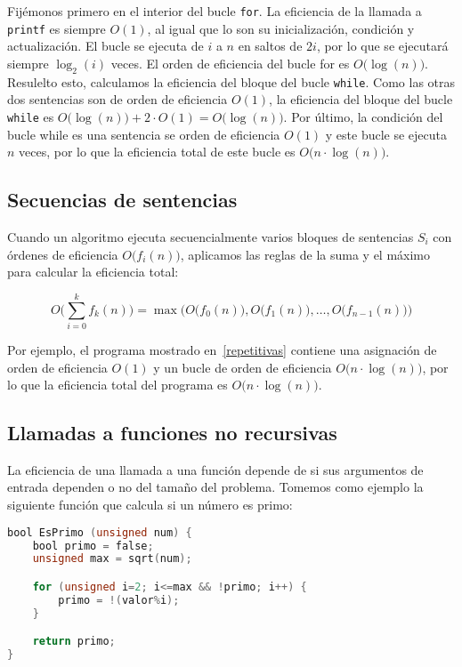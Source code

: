 Fijémonos primero en el interior del bucle \texttt{for}.
La eficiencia de la llamada a \texttt{printf} es siempre $O(1)$, al igual que lo son su inicialización, condición y actualización.
El bucle se ejecuta de $i$ a $n$ en saltos de $2i$, por lo que se ejecutará siempre $\log_2(i)$ veces.
El orden de eficiencia del bucle for es $O\big(\log(n)\big)$.
Resulelto esto, calculamos la eficiencia del bloque del bucle \texttt{while}.
Como las otras dos sentencias son de orden de eficiencia $O(1)$, la eficiencia del bloque del bucle \texttt{while} es $O\big(\log(n)\big)+2\cdot O(1)=O\big(\log(n)\big)$.
Por último, la condición del bucle while es una sentencia se orden de eficiencia $O(1)$ y este bucle se ejecuta $n$ veces, por lo que la eficiencia total de este bucle es $O\big(n\cdot\log(n)\big)$.

\pagebreak

\subsection{Secuencias de sentencias}\label{secuenciasentencias}

Cuando un algoritmo ejecuta secuencialmente varios bloques de sentencias $S_i$ con órdenes de eficiencia $O\big(f_i(n)\big)$, aplicamos las reglas de la suma y el máximo para calcular la eficiencia total:

\[O\Big(\sum_{i=0}^{k}f_k(n)\Big) = \max\Big(O\big(f_0(n)\big),O\big(f_1(n)\big),\ldots,O\big(f_{n-1}(n)\big)\Big)\]

Por ejemplo, el programa mostrado en~\ref{repetitivas} contiene una asignación de orden de eficiencia $O(1)$ y un bucle de orden de eficiencia $O\big(n\cdot\log(n)\big)$, por lo que la eficiencia total del programa es $O\big(n\cdot\log(n)\big)$.

\subsection{Llamadas a funciones no recursivas}

La eficiencia de una llamada a una función depende de si sus argumentos de entrada dependen o no del tamaño del problema.
Tomemos como ejemplo la siguiente función que calcula si un número es primo:

\begin{lstlisting}[language=C]
bool EsPrimo (unsigned num) {
	bool primo = false;
	unsigned max = sqrt(num);

	for (unsigned i=2; i<=max && !primo; i++) {
		primo = !(valor%i);
	}

	return primo;
}
\end{lstlisting}

